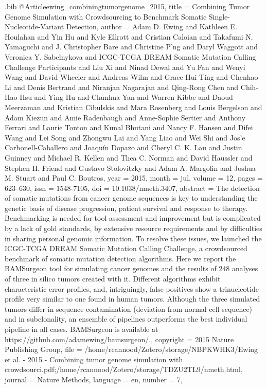 \documentclass[
  table,
  10pt,
  a4paper]{article}
\begin{document}
\begin{filecontents}{\jobname.bib}
@Article{ewing_combiningtumorgenome_2015,
	title = {Combining Tumor Genome Simulation with Crowdsourcing to Benchmark Somatic Single-Nucleotide-Variant Detection},
	author = {Adam D. Ewing and Kathleen E. Houlahan and Yin Hu and Kyle Ellrott and Cristian Caloian and Takafumi N. Yamaguchi and J. Christopher Bare and Christine P'ng and Daryl Waggott and Veronica Y. Sabelnykova and {ICGC-TCGA DREAM Somatic Mutation Calling Challenge Participants} and Liu Xi and Ninad Dewal and Yu Fan and Wenyi Wang and David Wheeler and Andreas Wilm and Grace Hui Ting and Chenhao Li and Denis Bertrand and Niranjan Nagarajan and Qing-Rong Chen and Chih-Hao Hsu and Ying Hu and Chunhua Yan and Warren Kibbe and Daoud Meerzaman and Kristian Cibulskis and Mara Rosenberg and Louis Bergelson and Adam Kiezun and Amie Radenbaugh and Anne-Sophie Sertier and Anthony Ferrari and Laurie Tonton and Kunal Bhutani and Nancy F. Hansen and Difei Wang and Lei Song and Zhongwu Lai and Yang Liao and Wei Shi and Jos{\a'e} Carbonell-Caballero and Joaqu\'in Dopazo and Cheryl C. K. Lau and Justin Guinney and Michael R. Kellen and Thea C. Norman and David Haussler and Stephen H. Friend and Gustavo Stolovitzky and Adam A. Margolin and Joshua M. Stuart and Paul C. Boutros},
	year = {2015},
	month = {jul},
	volume = {12},
	pages = {623--630},
	issn = {1548-7105},
	doi = {10.1038/nmeth.3407},
	abstract = {The detection of somatic mutations from cancer genome sequences is key to understanding the genetic basis of disease progression, patient survival and response to therapy. Benchmarking is needed for tool assessment and improvement but is complicated by a lack of gold standards, by extensive resource requirements and by difficulties in sharing personal genomic information. To resolve these issues, we launched the ICGC-TCGA DREAM Somatic Mutation Calling Challenge, a crowdsourced benchmark of somatic mutation detection algorithms. Here we report the BAMSurgeon tool for simulating cancer genomes and the results of 248 analyses of three in silico tumors created with it. Different algorithms exhibit characteristic error profiles, and, intriguingly, false positives show a trinucleotide profile very similar to one found in human tumors. Although the three simulated tumors differ in sequence contamination (deviation from normal cell sequence) and in subclonality, an ensemble of pipelines outperforms the best individual pipeline in all cases. BAMSurgeon is available at https://github.com/adamewing/bamsurgeon/.},
	copyright = {2015 Nature Publishing Group},
	file = {/home/rcannood/Zotero/storage/NBPKWHK3/Ewing et al. - 2015 - Combining tumor genome simulation with crowdsourci.pdf;/home/rcannood/Zotero/storage/TDZU2TL9/nmeth.html},
	journal = {Nature Methods},
	language = {en},
	number = {7},
}


\end{filecontents}
\end{document}
